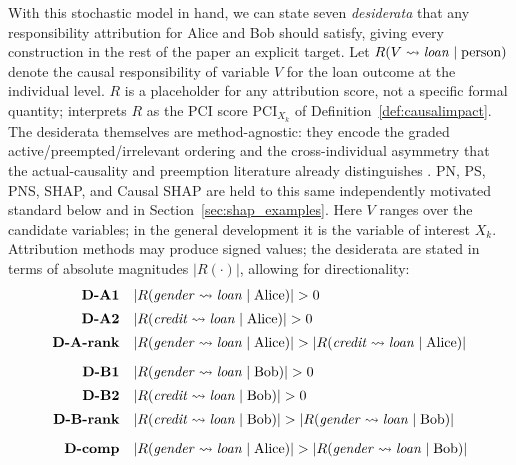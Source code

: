 With this stochastic model in hand, we can state seven \emph{desiderata} that any
responsibility attribution for Alice and Bob should satisfy, giving every construction
in the rest of the paper an explicit target.
Let $R(V \rightsquigarrow \varname{loan} \mid \text{person})$ denote the causal responsibility of variable $V$
for the loan outcome at the individual level. $R$ is a placeholder for any attribution score, not a
specific formal quantity; \ourapproach interprets $R$ as the
PCI score $\mathrm{PCI}_{X_k}$ of Definition~\ref{def:causalimpact}.
The desiderata themselves are
method-agnostic: they encode the graded active/preempted/irrelevant ordering and the
cross-individual asymmetry that the actual-causality and preemption literature
already distinguishes \citep{lewis1973causation,hall2004two,actualCausalityHalpern}.
PN, PS, PNS, SHAP,
and Causal SHAP are held to this same independently motivated standard below and in
Section~\ref{sec:shap_examples}. Here $V$ ranges over the candidate variables; in the general development
it is the variable of interest $X_k$.
Attribution methods may produce signed values; the desiderata are stated in terms of absolute
magnitudes $|R(\cdot)|$, allowing for directionality:
\label{desid}
\begin{align*}
\textbf{D-A1} \quad & |R(\varname{gender} \rightsquigarrow \varname{loan} \mid \text{Alice})| > 0 \\[2pt]
\textbf{D-A2} \quad & |R(\varname{credit} \rightsquigarrow \varname{loan} \mid \text{Alice})| > 0 \\[2pt]
\textbf{D-A-rank} \quad & |R(\varname{gender} \rightsquigarrow \varname{loan} \mid \text{Alice})| > |R(\varname{credit} \rightsquigarrow \varname{loan} \mid \text{Alice})| \\[6pt]
\textbf{D-B1} \quad & |R(\varname{gender} \rightsquigarrow \varname{loan} \mid \text{Bob})| > 0 \\[2pt]
\textbf{D-B2} \quad & |R(\varname{credit} \rightsquigarrow \varname{loan} \mid \text{Bob})| > 0 \\[2pt]
\textbf{D-B-rank} \quad & |R(\varname{credit} \rightsquigarrow \varname{loan} \mid \text{Bob})| > |R(\varname{gender} \rightsquigarrow \varname{loan} \mid \text{Bob})| \\[6pt]
\textbf{D-comp} \quad & |R(\varname{gender} \rightsquigarrow \varname{loan} \mid \text{Alice})| > |R(\varname{gender} \rightsquigarrow \varname{loan} \mid \text{Bob})|
\end{align*}


